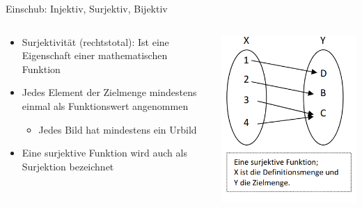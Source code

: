 \documentclass[12pt%
,aspectratio=169%
]{beamer}
\begin{document}
\begin{frame}{Einschub: Injektiv, Surjektiv, Bijektiv}
\begin{columns}[T] %
\begin{column}{.58\textwidth}
\begin{itemize}
	\item Surjektivität (rechtstotal): Ist eine Eigenschaft einer mathematischen Funktion
	\item Jedes Element der Zielmenge mindestens einmal als Funktionswert angenommen
	\begin{itemize}
		\item Jedes Bild hat mindestens ein Urbild
	\end{itemize}	
	\item Eine surjektive Funktion wird auch als Surjektion bezeichnet
\end{itemize}
\end{column}%
\hfill%
\begin{column}{.38\textwidth}
\centering
\includegraphics[scale=0.4]{pictures/surjektiv}
\end{column}%
\end{columns}
\end{frame}
\end{document}
